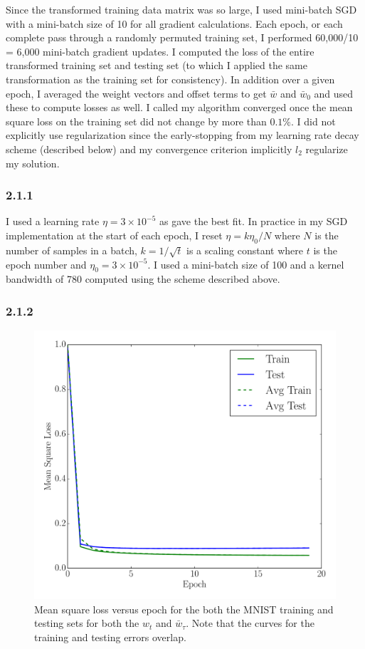 \documentclass[12pt]{amsart}
\begin{document}
Since the transformed training data matrix was so large, I used mini-batch SGD with a mini-batch size of 10 for all gradient calculations.  Each epoch, or each complete pass through a randomly permuted training set, I performed 60,000/10 = 6,000 mini-batch gradient updates.  I computed the loss of the entire transformed training set and testing set (to which I applied the same transformation as the training set for consistency).  In addition over a given epoch, I averaged the weight vectors and offset terms to get $\bar{w}$ and $\bar{w}_0$ and used these to compute losses as well.  I called my algorithm converged once the mean square loss on the training set did not change by more than $0.1\%$.  I did not explicitly use regularization since the early-stopping from my learning rate decay scheme (described below) and my convergence criterion implicitly $l_2$ regularize my solution.

\subsubsection*{2.1.1}

I used a learning rate $\eta = 3 \times 10^{-5}$ as gave the best fit.  In practice in my SGD implementation at the start of each epoch, I reset $\eta = k\eta_0/N$ where $N$ is the number of samples in a batch, $k = 1/\sqrt{t}$ is a scaling constant where $t$ is the epoch number and $\eta_0 = 3 \times 10^{-5}$.  I used a mini-batch size of 100 and a kernel bandwidth of 780 computed using the scheme described above.

\subsubsection*{2.1.2}

\begin{figure}[H]
	\includegraphics[width=\columnwidth]{pca_square_loss.pdf}
    \caption{Mean square loss versus epoch for the both the MNIST training and testing sets for both the $w_t$ and $\bar{w}_{\tau}$. Note that the curves for the training and testing errors overlap.}
    \label{fig:pca_square_loss}
\end{figure}
\end{document}
